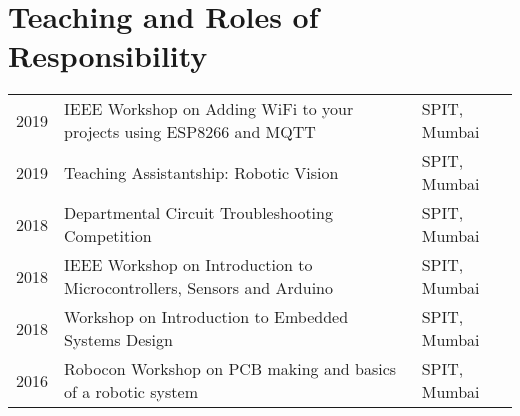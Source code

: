 \documentclass[]{deedy-resume-openfont}
\begin{document}

\section{Teaching and Roles of Responsibility} 
\begin{tabular}{rll}
2019	  & IEEE Workshop on Adding WiFi to your projects using ESP8266 and MQTT  & SPIT, Mumbai   \\
2019	  & Teaching Assistantship: Robotic Vision  & SPIT, Mumbai   \\
2018	  & Departmental Circuit Troubleshooting Competition  & SPIT, Mumbai   \\
2018	  & IEEE Workshop on Introduction to Microcontrollers, Sensors and Arduino  & SPIT, Mumbai   \\
2018	  & Workshop on Introduction to Embedded Systems Design  & SPIT, Mumbai   \\
2016	  & Robocon Workshop on PCB making and basics of a robotic system  & SPIT, Mumbai   \\
\end{tabular}
\sectionsep





%
%
\end{document}
